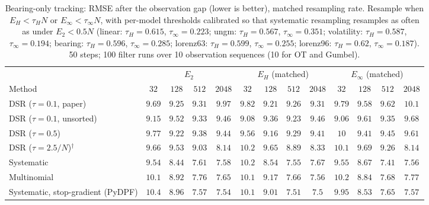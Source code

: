 \begin{table}[ht]
\centering
\small
\caption{Bearing-only tracking: RMSE after the observation gap (lower is better), matched resampling rate. Resample when $E_H<\tau_HN$ or $E_\infty<\tau_\infty N$, with per-model thresholds calibrated so that systematic resampling resamples as often as under $E_2<0.5N$ (linear: $\tau_H{=}0.615$, $\tau_\infty{=}0.223$; ungm: $\tau_H{=}0.567$, $\tau_\infty{=}0.351$; volatility: $\tau_H{=}0.587$, $\tau_\infty{=}0.194$; bearing: $\tau_H{=}0.596$, $\tau_\infty{=}0.285$; lorenz63: $\tau_H{=}0.599$, $\tau_\infty{=}0.255$; lorenz96: $\tau_H{=}0.62$, $\tau_\infty{=}0.187$). 50 steps; 100 filter runs over 10 observation sequences (10 for OT and Gumbel).}
\label{tab:trigger-matched-bearing-post_occlusion_rmse}
\begin{adjustbox}{max width=\linewidth}
\begin{tabular}{lcccc|cccc|cccc}
\toprule
 & \multicolumn{4}{c}{$E_2$} & \multicolumn{4}{c}{$E_H$ (matched)} & \multicolumn{4}{c}{$E_\infty$ (matched)} \\
\cmidrule(lr){2-5} \cmidrule(lr){6-9} \cmidrule(lr){10-13}
Method & $32$ & $128$ & $512$ & $2048$ & $32$ & $128$ & $512$ & $2048$ & $32$ & $128$ & $512$ & $2048$ \\
\midrule
DSR ($\tau{=}0.1$, paper) & $\mathbf{9.69}$ & $9.25$ & $9.31$ & $9.97$ & $9.82$ & $\mathbf{9.21}$ & $\mathbf{9.26}$ & $\mathbf{9.31}$ & $9.79$ & $9.58$ & $9.62$ & $10.1$ \\
DSR ($\tau{=}0.1$, unsorted) & $9.15$ & $9.52$ & $9.33$ & $9.46$ & $9.08$ & $\mathbf{9.36}$ & $\mathbf{9.23}$ & $\mathbf{9.46}$ & $\mathbf{9.06}$ & $9.61$ & $9.35$ & $9.68$ \\
DSR ($\tau{=}0.5$) & $9.77$ & $9.22$ & $9.38$ & $9.44$ & $\mathbf{9.56}$ & $\mathbf{9.16}$ & $\mathbf{9.29}$ & $\mathbf{9.41}$ & $10$ & $9.41$ & $9.45$ & $9.61$ \\
DSR ($\tau{=}2.5/N$)$^\dagger$ & $\mathbf{9.66}$ & $\mathbf{9.53}$ & $9.03$ & $8.14$ & $10.2$ & $9.65$ & $\mathbf{8.89}$ & $8.33$ & $10.1$ & $9.69$ & $9.26$ & $\mathbf{8.14}$ \\
\midrule
Systematic & $\mathbf{9.54}$ & $\mathbf{8.44}$ & $7.61$ & $7.58$ & $10.2$ & $8.54$ & $7.55$ & $7.67$ & $9.55$ & $8.67$ & $\mathbf{7.41}$ & $\mathbf{7.56}$ \\
Multinomial & $10.1$ & $8.92$ & $7.76$ & $7.65$ & $\mathbf{10.1}$ & $9.17$ & $\mathbf{7.66}$ & $\mathbf{7.56}$ & $10.2$ & $\mathbf{8.84}$ & $7.68$ & $7.77$ \\
Systematic, stop-gradient (PyDPF) & $10.4$ & $8.96$ & $7.57$ & $7.54$ & $10.1$ & $9.01$ & $\mathbf{7.51}$ & $\mathbf{7.5}$ & $\mathbf{9.95}$ & $\mathbf{8.53}$ & $7.65$ & $7.57$ \\

\end{tabular}
\end{adjustbox}
\end{table}
